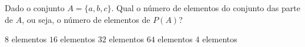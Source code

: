 \noindent\parbox{\linewidth}{

Dado o conjunto $A=\{a,b,c\}$. Qual o número de elementos do conjunto das parte de $A$, ou seja, o número de elementos de $P(A)$?

$8$ elementos
$16$ elementos
$32$ elementos
$64$ elementos
$4$ elementos




}



